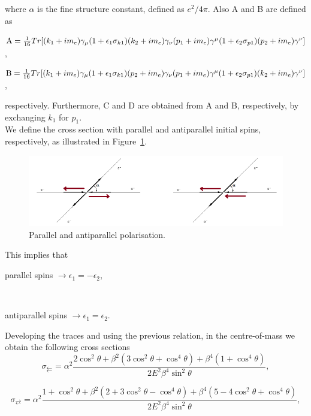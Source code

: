 \documentclass[10pt,swedish, openany]{book}
\begin{document}
where $\alpha$ is the fine structure constant, defined as $e^2/4\pi$. Also A and B are defined as 

\centerline{${\rm A} =  \frac{1}{16} Tr[(k_1+im_e)\gamma_{\mu}(1+\epsilon_1\sigma_{k1})(k_2+im_e)\gamma_{\nu}(p_1+im_e)\gamma^{\mu}(1+\epsilon_2\sigma_{p1})(p_2+im_e)\gamma^{\nu}]$,}

\centerline{${\rm B} = \frac{1}{16} Tr[(k_1+im_e)\gamma_{\mu}(1+\epsilon_1\sigma_{k1})(p_2+im_e)\gamma_{\nu}(p_1+im_e)\gamma^{\mu}(1+\epsilon_2\sigma_{p1})(k_2+im_e)\gamma^{\nu}]$,}

respectively. Furthermore, C and D are obtained from A and B, respectively, by exchanging $k_1$ for $p_1$.\\

We define the cross section with parallel and antiparallel initial spins, respectively, as illustrated in Figure~\ref{fig:ParallelAntiparallelPolarisation}.

\begin{figure}[h]
\includegraphics[scale=0.5]{polarisation.png}
\centering
\caption{Parallel and antiparallel polarisation.}
\label{fig:ParallelAntiparallelPolarisation}
\end{figure}

This implies that \\
        \centerline{parallel spins $\rightarrow \epsilon_1 = - \epsilon_2$, }\\
        \centerline{antiparallel spins $\rightarrow \epsilon_1 = \epsilon_2$.}
        
 Developing the traces and using the previous relation, in the centre-of-mass we obtain the following cross sections
 \begin{equation}
     \sigma_{\leftleftarrows} = \alpha^2 \frac{2\cos^2{\theta}+\beta^2(3\cos^2{\theta}+\cos^4{\theta})+\beta^4(1+\cos^4{\theta})}{2E^2\beta^4\sin^2{\theta}},
 \end{equation}
 
 \begin{equation}
     \sigma_{\rightleftarrows} = \alpha^2 \frac{1+\cos^2{\theta}+\beta^2(2+3\cos^2{\theta}-\cos^4{\theta})+\beta^4(5-4\cos^2{\theta}+\cos^4{\theta})}{2E^2\beta^4\sin^2{\theta}},
 \end{equation}
 
\end{document}
